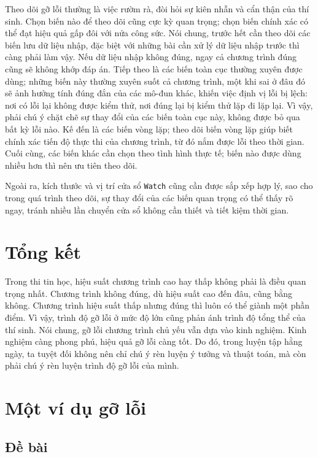 \documentclass[11pt]{article}
\begin{document}
Theo dõi gỡ lỗi thường là việc rườm rà, đòi hỏi sự kiên nhẫn và cẩn thận của
thí sinh. Chọn biến nào để theo dõi cũng cực kỳ quan trọng; chọn biến chính
xác có thể đạt hiệu quả gấp đôi với nửa công sức. Nói chung, trước hết cần
theo dõi các biến lưu dữ liệu nhập, đặc biệt với những bài cần xử lý dữ liệu
nhập trước thì càng phải làm vậy. Nếu dữ liệu nhập không đúng, ngay cả chương
trình đúng cũng sẽ không khớp đáp án. Tiếp theo là các biến toàn cục thường
xuyên được dùng; những biến này thường xuyên suốt cả chương trình, một khi
sai ở đâu đó sẽ ảnh hưởng tính đúng đắn của các mô-đun khác, khiến việc định
vị lỗi bị lệch: nơi có lỗi lại không được kiểm thử, nơi đúng lại bị kiểm thử
lặp đi lặp lại. Vì vậy, phải chú ý chặt chẽ sự thay đổi của các biến toàn cục
này, không được bỏ qua bất kỳ lỗi nào. Kế đến là các biến vòng lặp; theo dõi
biến vòng lặp giúp biết chính xác tiến độ thực thi của chương trình, từ đó
nắm được lỗi theo thời gian. Cuối cùng, các biến khác cần chọn theo tình hình
thực tế; biến nào được dùng nhiều hơn thì nên ưu tiên theo dõi.

Ngoài ra, kích thước và vị trí cửa sổ \texttt{Watch} cũng cần được sắp xếp
hợp lý, sao cho trong quá trình theo dõi, sự thay đổi của các biến quan trọng
có thể thấy rõ ngay, tránh nhiều lần chuyển cửa sổ không cần thiết và tiết
kiệm thời gian.

\section{Tổng kết}

Trong thi tin học, hiệu suất chương trình cao hay thấp không phải là điều
quan trọng nhất. Chương trình không đúng, dù hiệu suất cao đến đâu, cũng bằng
không. Chương trình hiệu suất thấp nhưng đúng thì luôn có thể giành một phần
điểm. Vì vậy, trình độ gỡ lỗi ở mức độ lớn cũng phản ánh trình độ tổng thể
của thí sinh. Nói chung, gỡ lỗi chương trình chủ yếu vẫn dựa vào kinh nghiệm.
Kinh nghiệm càng phong phú, hiệu quả gỡ lỗi càng tốt. Do đó, trong luyện tập
hằng ngày, ta tuyệt đối không nên chỉ chú ý rèn luyện ý tưởng và thuật toán,
mà còn phải chú ý rèn luyện trình độ gỡ lỗi của mình.

\section{Một ví dụ gỡ lỗi}

\subsection*{Đề bài}
\end{document}
